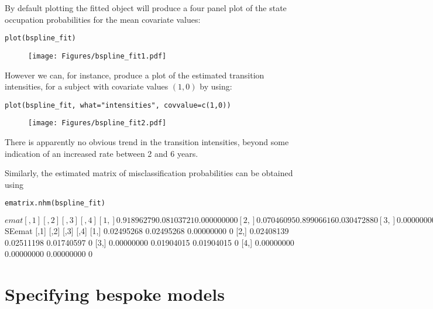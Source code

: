 \documentclass{article}
\numberwithin{equation}{section}
\begin{document}
By default plotting the fitted object will produce a four panel plot of the state occupation probabilities for the mean covariate values:

\begin{verbatim}
plot(bspline_fit)
\end{verbatim}

\begin{figure}[ht]
\begin{center}
\texttt{[image: Figures/bspline\_fit1.pdf]}
\end{center}
\end{figure}

However we can, for instance, produce a plot of the estimated transition intensities, for a subject with covariate values $(1,0)$ by using:

\begin{verbatim}
plot(bspline_fit, what="intensities", covvalue=c(1,0))
\end{verbatim}
\begin{figure}[ht]
\begin{center}
\texttt{[image: Figures/bspline\_fit2.pdf]}
\end{center}
\end{figure}


There is apparently no obvious trend in the transition intensities, beyond some indication of an increased rate between 2 and 6 years.

Similarly, the estimated matrix of misclassification probabilities can be obtained using
\begin{verbatim}
ematrix.nhm(bspline_fit)
\end{verbatim}
\begin{verbout}
$emat
           [,1]       [,2]       [,3] [,4]
[1,] 0.91896279 0.08103721 0.00000000    0
[2,] 0.07046095 0.89906616 0.03047288    0
[3,] 0.00000000 0.09200885 0.90799115    0
[4,] 0.00000000 0.00000000 0.00000000    1

$SEemat
           [,1]       [,2]       [,3] [,4]
[1,] 0.02495268 0.02495268 0.00000000    0
[2,] 0.02408139 0.02511198 0.01740597    0
[3,] 0.00000000 0.01904015 0.01904015    0
[4,] 0.00000000 0.00000000 0.00000000    0
\end{verbout}


\section{Specifying bespoke models}
\label{sec:bespoke}
\end{document}
